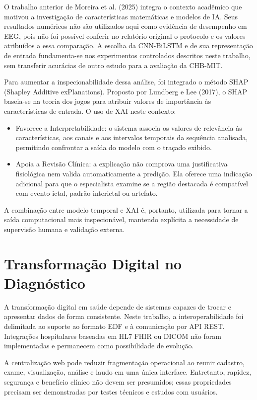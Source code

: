 O trabalho anterior de Moreira et al. (2025) integra o contexto acadêmico que motivou a investigação de características matemáticas e modelos de IA. Seus resultados numéricos não são utilizados aqui como evidência de desempenho em EEG, pois não foi possível conferir no relatório original o protocolo e os valores atribuídos a essa comparação. A escolha da CNN-BiLSTM e de sua representação de entrada fundamenta-se nos experimentos controlados descritos neste trabalho, sem transferir acurácias de outro estudo para a avaliação da CHB-MIT.

Para aumentar a inspecionabilidade dessa análise, foi integrado o método SHAP (Shapley Additive exPlanations). Proposto por Lundberg e Lee (2017), o SHAP baseia-se na teoria dos jogos para atribuir valores de importância às características de entrada. O uso de XAI neste contexto:

\begin{itemize}[leftmargin=1.25cm,itemsep=0pt,topsep=0pt]
\item Favorece a Interpretabilidade: o sistema associa os valores de relevância às características, aos canais e aos intervalos temporais da sequência analisada, permitindo confrontar a saída do modelo com o traçado exibido.
\item Apoia a Revisão Clínica: a explicação não comprova uma justificativa fisiológica nem valida automaticamente a predição. Ela oferece uma indicação adicional para que o especialista examine se a região destacada é compatível com evento ictal, padrão interictal ou artefato.
\end{itemize}
A combinação entre modelo temporal e XAI é, portanto, utilizada para tornar a saída computacional mais inspecionável, mantendo explícita a necessidade de supervisão humana e validação externa.

\section{Transformação Digital no Diagnóstico}
A transformação digital em saúde depende de sistemas capazes de trocar e apresentar dados de forma consistente. Neste trabalho, a interoperabilidade foi delimitada ao suporte ao formato EDF e à comunicação por API REST. Integrações hospitalares baseadas em HL7 FHIR ou DICOM não foram implementadas e permanecem como possibilidade de evolução.

A centralização web pode reduzir fragmentação operacional ao reunir cadastro, exame, visualização, análise e laudo em uma única interface. Entretanto, rapidez, segurança e benefício clínico não devem ser presumidos; essas propriedades precisam ser demonstradas por testes técnicos e estudos com usuários.

